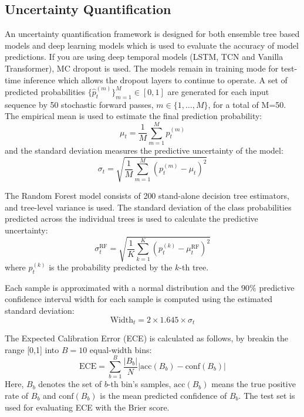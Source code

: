 \documentclass{ieeeaccess}
\begin{document}
\subsection{Uncertainty Quantification}
An uncertainty quantification framework is designed for both ensemble tree based models and deep learning models which is used to evaluate the accuracy of model predictions. 
If you are using deep temporal models (LSTM, TCN and Vanilla Transformer), MC dropout is used. The models remain in training mode for test-time inference which allows the dropout layers to continue to operate. A set of predicted probabilities $\{\hat{p}_t^{(m)}\}_{m=1}^M \in [0, 1]$ are generated for each input sequence by 50 stochastic forward passes, $m \in \{1, \dots, M\}$, for a total of M=50. The empirical mean is used to estimate the final prediction probability:
\begin{equation}
\mu_t = \frac{1}{M} \sum_{m=1}^M p^{(m)}_t
\end{equation}
and the standard deviation measures the predictive uncertainty of the model:
\begin{equation}
\sigma_t = \sqrt{\frac{1}{M} \sum_{m=1}^M \left(p^{(m)}_t - \mu_t\right)^2}
\end{equation}

The Random Forest model consists of 200 stand-alone decision tree estimators, and tree-level variance is used. The standard deviation of the class probabilities predicted across the individual trees is used to calculate the predictive uncertainty:
\begin{equation}
\sigma_t^{\text{RF}} = \sqrt{\frac{1}{K} \sum_{k=1}^K \left(p^{(k)}_t - \mu_t^{\text{RF}}\right)^2}
\end{equation}
where $p^{(k)}_t$ is the probability predicted by the $k$-th tree.

Each sample is approximated with a normal distribution and the $90\%$ predictive confidence interval width for each sample is computed using the estimated standard deviation:
\begin{equation}
\text{Width}_t = 2 \times 1.645 \times \sigma_t
\end{equation}

The Expected Calibration Error (ECE) is calculated as follows, by breakin the range [0,1] into $B=10$ equal-width bins:
\begin{equation}
\text{ECE} = \sum_{b=1}^B \frac{|B_b|}{N} \left| \text{acc}(B_b) - \text{conf}(B_b) \right|
\end{equation}
Here, $B_b$ denotes the set of $b$-th bin's samples, $\text{acc}(B_b)$ means the true positive rate of $B_b$ and $\text{conf}(B_b)$ is the mean predicted confidence of $B_b$. The test set is used for evaluating ECE with the Brier score.
\end{document}
